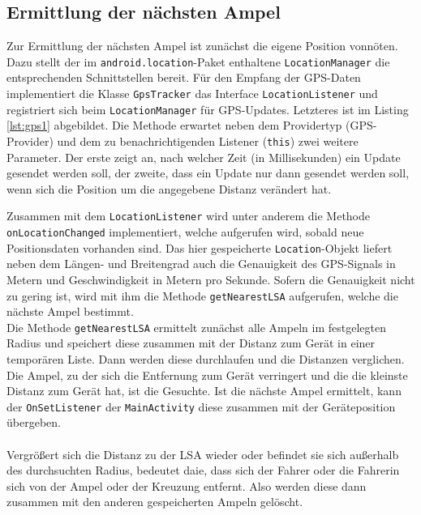 \subsection{Ermittlung der nächsten Ampel}
Zur Ermittlung der nächsten Ampel ist zunächst die eigene Position vonnöten. Dazu stellt der im \texttt{android.location}-Paket enthaltene \texttt{LocationManager} die entsprechenden Schnittstellen bereit. Für den Empfang der \gls{GPS}-Daten implementiert die Klasse \texttt{GpsTracker} das Interface \texttt{LocationListener} und registriert sich beim \texttt{LocationManager} für \gls{GPS}-Updates.
Letzteres ist im Listing \ref{lst:gps1} abgebildet. Die Methode erwartet neben dem Providertyp (\gls{GPS}-Provider) und dem zu benachrichtigenden Listener (\texttt{this}) zwei weitere Parameter. Der erste zeigt an, nach welcher Zeit (in Millisekunden) ein Update gesendet werden soll, der zweite, dass ein Update nur dann gesendet werden soll, wenn sich die Position um die angegebene Distanz verändert hat.
\begin{center}
\grayRule

\grayRule
\end{center}
Zusammen mit dem \texttt{LocationListener} wird unter anderem die Methode \texttt{onLocationChanged} implementiert, welche aufgerufen wird, sobald neue Positionsdaten vorhanden sind. Das hier gespeicherte \texttt{Location}-Objekt liefert neben dem Längen- und Breitengrad auch die Genauigkeit des \gls{GPS}-Signals in Metern und Geschwindigkeit in Metern pro Sekunde. Sofern die Genauigkeit nicht zu gering ist, wird mit ihm die Methode \texttt{getNearestLSA} aufgerufen, welche die nächste Ampel bestimmt.\\
Die Methode \texttt{getNearestLSA} ermittelt zunächst alle Ampeln im festgelegten Radius und speichert diese zusammen mit der Distanz zum Gerät in einer temporären Liste. Dann werden diese durchlaufen und die Distanzen verglichen. Die Ampel, zu der sich die Entfernung zum Gerät verringert und die die kleinste Distanz zum Gerät hat, ist die Gesuchte. Ist die nächste Ampel ermittelt, kann der \texttt{OnSetListener} der \texttt{MainActivity} diese zusammen mit der Geräteposition übergeben. \\\\
Vergrößert sich die Distanz zu der \gls{LSA} wieder oder befindet sie sich außerhalb des durchsuchten Radius, bedeutet daie, dass sich der Fahrer oder die Fahrerin sich von der Ampel oder der Kreuzung entfernt. Also werden diese dann zusammen mit den anderen gespeicherten Ampeln gelöscht.\\ 
\begin{center}
\grayRule

\grayRule
\end{center}
%
%

